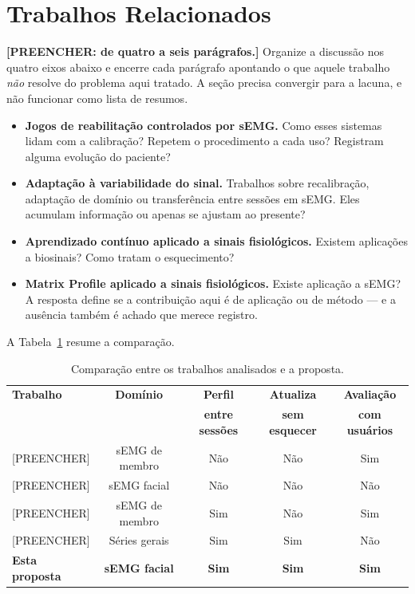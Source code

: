 \section{Trabalhos Relacionados}

\textbf{[PREENCHER: de quatro a seis parágrafos.]} Organize a discussão
nos quatro eixos abaixo e encerre cada parágrafo apontando o que aquele
trabalho \textit{não} resolve do problema aqui tratado. A seção precisa
convergir para a lacuna, e não funcionar como lista de resumos.

\begin{itemize}
    \item \textbf{Jogos de reabilitação controlados por sEMG.} Como
    esses sistemas lidam com a calibração? Repetem o procedimento a
    cada uso? Registram alguma evolução do paciente?

    \item \textbf{Adaptação à variabilidade do sinal.} Trabalhos sobre
    recalibração, adaptação de domínio ou transferência entre sessões
    em sEMG. Eles acumulam informação ou apenas se ajustam ao presente?

    \item \textbf{Aprendizado contínuo aplicado a sinais fisiológicos.}
    Existem aplicações a biosinais? Como tratam o esquecimento?

    \item \textbf{Matrix Profile aplicado a sinais fisiológicos.}
    Existe aplicação a sEMG? A resposta define se a contribuição aqui é
    de aplicação ou de método --- e a ausência também é achado que
    merece registro.
\end{itemize}

A Tabela~\ref{tab:relacionados} resume a comparação.

\begin{table}[htb]
\centering
\caption{Comparação entre os trabalhos analisados e a proposta.}
\label{tab:relacionados}
\small
\begin{tabular}{@{}lcccc@{}}
\toprule
\textbf{Trabalho} & \textbf{Domínio} & \textbf{Perfil} & \textbf{Atualiza} & \textbf{Avaliação} \\
                  &                  & \textbf{entre sessões} & \textbf{sem esquecer} & \textbf{com usuários} \\
\midrule
{[PREENCHER]} & sEMG de membro & Não & Não & Sim \\
{[PREENCHER]} & sEMG facial    & Não & Não & Não \\
{[PREENCHER]} & sEMG de membro & Sim & Não & Sim \\
{[PREENCHER]} & Séries gerais  & Sim & Sim & Não \\
\midrule
\textbf{Esta proposta} & \textbf{sEMG facial} & \textbf{Sim} & \textbf{Sim} & \textbf{Sim} \\
\bottomrule
\end{tabular}
\end{table}

